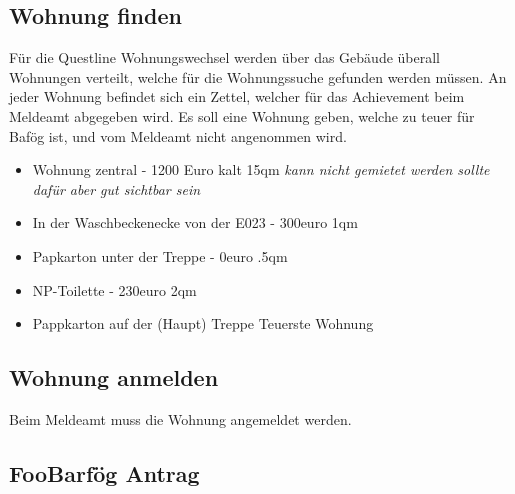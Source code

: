 
\subsection{Wohnung finden}
Für die Questline Wohnungswechsel werden über das Gebäude überall Wohnungen verteilt, welche für die Wohnungssuche gefunden werden müssen. An jeder Wohnung befindet sich ein Zettel, welcher für das Achievement beim Meldeamt abgegeben wird. Es soll eine Wohnung geben, welche zu teuer für Bafög ist, und vom Meldeamt nicht angenommen wird.

\begin{itemize}
    \item Wohnung zentral - 1200 Euro kalt 15qm \textit{kann nicht gemietet werden sollte dafür aber gut sichtbar sein}
    \item In der Waschbeckenecke von der E023 - 300euro 1qm
    \item Papkarton unter der Treppe - 0euro .5qm
    \item NP-Toilette - 230euro 2qm
    \item Pappkarton auf der (Haupt) Treppe Teuerste Wohnung
\end{itemize}

\subsection{Wohnung anmelden}
Beim Meldeamt muss die Wohnung angemeldet werden.

\subsection{FooBarfög Antrag}